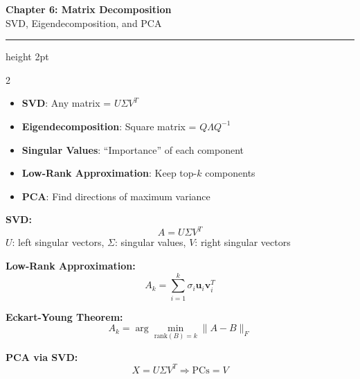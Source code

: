 \documentclass[11pt,letterpaper]{article}
\begin{document}
\begin{center}
{\LARGE\bfseries\color{primaryblue} Chapter 6: Matrix Decomposition}\\[3pt]
{\large SVD, Eigendecomposition, and PCA}
\end{center}
\vspace{-5pt}
\hrule height 2pt
\vspace{8pt}

\begin{multicols}{2}

\begin{tcolorbox}[conceptbox, title={\faLightbulb\ Key Concepts}]
\begin{itemize}
    \item \textbf{SVD}: Any matrix = $U\Sigma V^T$
    \item \textbf{Eigendecomposition}: Square matrix = $Q\Lambda Q^{-1}$
    \item \textbf{Singular Values}: ``Importance'' of each component
    \item \textbf{Low-Rank Approximation}: Keep top-$k$ components
    \item \textbf{PCA}: Find directions of maximum variance
\end{itemize}
\end{tcolorbox}

\begin{tcolorbox}[formulabox, title={\faCalculator\ Core Formulas}]
\textbf{SVD:}
\[ A = U \Sigma V^T \]
$U$: left singular vectors, $\Sigma$: singular values, $V$: right singular vectors

\textbf{Low-Rank Approximation:}
\[ A_k = \sum_{i=1}^{k} \sigma_i \mathbf{u}_i \mathbf{v}_i^T \]

\textbf{Eckart-Young Theorem:}
\[ A_k = \arg\min_{\text{rank}(B)=k} \|A - B\|_F \]

\textbf{PCA via SVD:}
\[ X = U\Sigma V^T \Rightarrow \text{PCs} = V \]
\end{tcolorbox}

\columnbreak

\begin{center}
\end{center}
\end{multicols}
\end{document}
